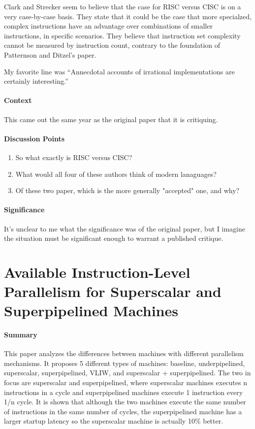 Clark and Strecker seem to believe that the case for RISC versus CISC is on a
very case-by-case basis. They state that it could be the case that more
specialzed, complex instructions have an advantage over combinations of smaller
instructions, in specific scenarios. They believe that instruction set
complexity cannot be measured by instruction count, contrary to the foundation
of Patternson and Ditzel's paper.

My favorite line was ``Annecdotal accounts of irrational implementations are
certainly interesting.''
\paragraph{\textbf{Context}}
This came out the same year as the original paper that it is critiquing.
\paragraph{\textbf{Discussion Points}}
\begin{enumerate}
    \item So what exactly is RISC versus CISC?
    \item What would all four of these authors think of modern lanaguages?
    \item Of these two paper, which is the more generally "accepted" one, and why?
\end{enumerate}
\paragraph{\textbf{Significance}}
It's unclear to me what the significance was of the original paper, but I
imagine the situation must be significant enough to warrant a published
critique.

\section {Available Instruction-Level Parallelism for Superscalar and
Superpipelined Machines \cite{jouppi1989available}}

\paragraph{\textbf{Summary}}
This paper analyzes the differences between machines with different parallelism
mechanisms. It proposes 5 different types of machines: baseline, underpipelined,
superscalar, superpipelined, VLIW, and superscalar + superpipelined. The two in
focus are superscalar and superpipelined, where superscalar machines executes n
instructions in a cycle and superpipelined machines execute 1 instruction every
1/n cycle. It is shown that although the two machines execute the same number of
instructions in the same number of cycles, the superpipelined machine has a
larger startup latency so the superscalar machine is actually 10\% better.

